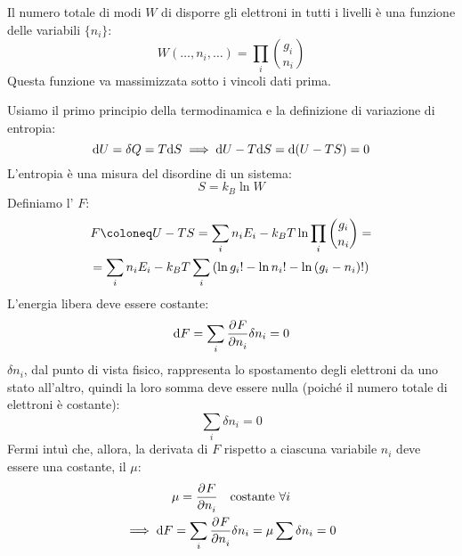 Il numero totale di modi $W$ di disporre gli elettroni in tutti i livelli è una funzione delle variabili $\{n_i\}$:
\begin{equation}
    W(\ldots, n_i, \ldots) = \prod_i \binom{g_i}{n_i}
\end{equation}
Questa funzione va massimizzata sotto i vincoli dati prima.

Usiamo il primo principio della termodinamica e la definizione di variazione di entropia:
\begin{equation}
    \mathrm{d} U = \delta Q = T \mathrm{d} S
    \implies \mathrm{d} U - T \mathrm{d} S = \mathrm{d} (U - T S) = 0
\end{equation}
L'entropia è una misura del disordine di un sistema:
\begin{equation}
    S = k_B \ln W
\end{equation}
Definiamo l' $F$:
\begin{equation}
\begin{gathered}
    F \coloneq U - T S = \sum_i n_i E_i - k_B T \ln \prod_i \binom{g_i}{n_i} = \\
    = \sum_i n_i E_i - k_B T \sum_i \pts{\ln g_i! - \ln n_i! - \ln{(g_i - n_i)!}}
\end{gathered}
\end{equation}
L'energia libera deve essere costante:
\begin{equation}
    \de F = \sum_i \parder[F]{n_i} \delta n_i = 0
\end{equation}
$\delta n_i$, dal punto di vista fisico, rappresenta lo spostamento degli elettroni da uno stato all'altro, quindi la loro somma deve essere nulla (poiché il numero totale di elettroni è costante):
\begin{equation}
    \sum_i \delta n_i = 0
\end{equation}
Fermi intuì che, allora, la derivata di $F$ rispetto a ciascuna variabile $n_i$ deve essere una costante, il  $\mu$:
\begin{gather}
    \mu = \parder[F]{n_i} \quad \text{costante } \forall i \\
    \implies \de F = \sum_i \parder[F]{n_i} \delta n_i = \mu \sum \delta n_i = 0
\end{gather}


